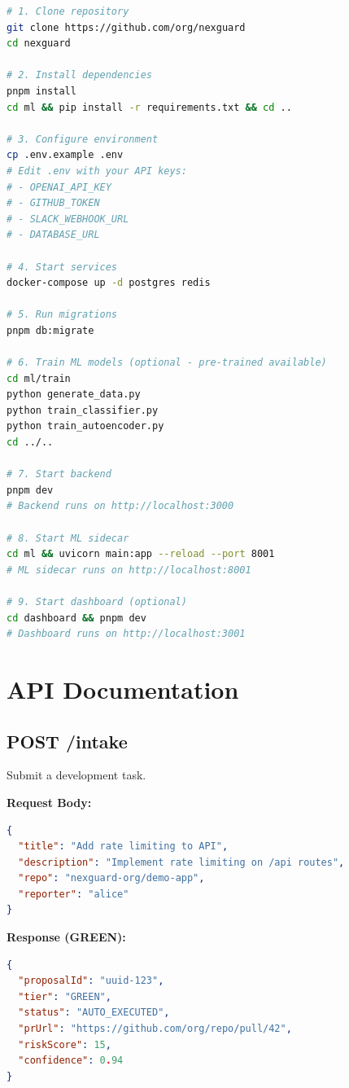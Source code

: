 \documentclass[11pt,a4paper]{article}
\begin{document}
\begin{lstlisting}[language=bash,caption=Setup Instructions]
# 1. Clone repository
git clone https://github.com/org/nexguard
cd nexguard

# 2. Install dependencies
pnpm install
cd ml && pip install -r requirements.txt && cd ..

# 3. Configure environment
cp .env.example .env
# Edit .env with your API keys:
# - OPENAI_API_KEY
# - GITHUB_TOKEN
# - SLACK_WEBHOOK_URL
# - DATABASE_URL

# 4. Start services
docker-compose up -d postgres redis

# 5. Run migrations
pnpm db:migrate

# 6. Train ML models (optional - pre-trained available)
cd ml/train
python generate_data.py
python train_classifier.py
python train_autoencoder.py
cd ../..

# 7. Start backend
pnpm dev
# Backend runs on http://localhost:3000

# 8. Start ML sidecar
cd ml && uvicorn main:app --reload --port 8001
# ML sidecar runs on http://localhost:8001

# 9. Start dashboard (optional)
cd dashboard && pnpm dev
# Dashboard runs on http://localhost:3001
\end{lstlisting}

\newpage
\section{API Documentation}

\subsection{POST /intake}
Submit a development task.

\textbf{Request Body:}
\begin{lstlisting}[language=json]
{
  "title": "Add rate limiting to API",
  "description": "Implement rate limiting on /api routes",
  "repo": "nexguard-org/demo-app",
  "reporter": "alice"
}
\end{lstlisting}

\textbf{Response (GREEN):}
\begin{lstlisting}[language=json]
{
  "proposalId": "uuid-123",
  "tier": "GREEN",
  "status": "AUTO_EXECUTED",
  "prUrl": "https://github.com/org/repo/pull/42",
  "riskScore": 15,
  "confidence": 0.94
}
\end{lstlisting}
\end{document}
